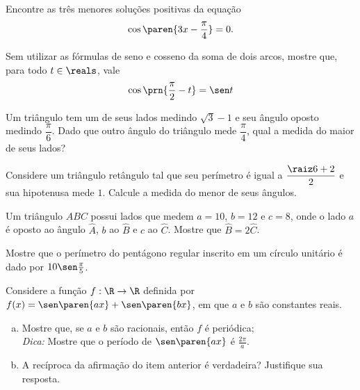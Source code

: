 \begin{exercise}
    Encontre as três menores soluções positivas da equação $$\cos
\paren{3x - \frac {\pi} 4} = 0.$$
\end{exercise}

\begin{exercise}
  Sem utilizar as fórmulas de seno e cosseno da soma de dois arcos,
  mostre que, para todo $t\in\reals$, vale \[\cos\prn{\frac \pi 2-t}=\sen t\]
\end{exercise}

\begin{exercise}
  Um triângulo tem um de seus lados medindo $\sqrt{3}-1$ e seu ângulo oposto medindo $\dfrac{\pi}{6}$. Dado que outro ângulo do triângulo mede $\dfrac{\pi}{4}$, qual a medida do maior de seus lados?
\end{exercise}

\begin{exercise}
  Considere um triângulo retângulo tal que seu perímetro é igual a $\dfrac{\raiz 6 + 2}{2}$ e sua hipotenusa mede $1$. Calcule a medida do menor de seus ângulos.
\end{exercise}

\begin{exercise}
  Um triângulo $ABC$ possui lados que medem $a=10$, $b = 12$ e $c=8$, onde o lado $a$ é oposto ao ângulo $\hat A$, $b$ ao $\hat B$ e $c$ ao $\hat C$. Mostre que $\hat B = 2\hat C$.
\end{exercise}

\begin{exercise}
    Mostre que o perímetro do pentágono regular inscrito em um
círculo unitário é dado por $10\sen \frac {\pi} 5$.
\end{exercise}

\begin{exercise}
    Considere a função $f: \R \to \R$ definida por $f(x) = \sen
\paren{ax}+\sen \paren{bx}$, em que $a$ e $b$ são constantes reais.
\begin{enumerate}[a)]
  \item Mostre que, se $a$ e $b$ são racionais, então $f$ é
  periódica;\\
  \emph{Dica:} Mostre que o período de $\sen \paren{ax}$ é $\frac
  {2\pi} a$.
  \item A recíproca da afirmação do item anterior é verdadeira?
  Justifique sua resposta.
\end{enumerate}
\end{exercise}

